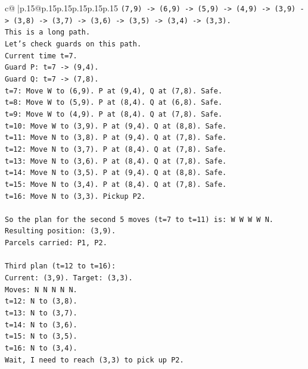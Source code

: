 \documentclass{article}
\begin{document}
{\begin{supertabular}{c@{$\;$}|p{.15\linewidth}@{}p{.15\linewidth}p{.15\linewidth}p{.15\linewidth}p{.15\linewidth}p{.15\linewidth}}
{{{\texttt{(7,9) {-}> (6,9) {-}> (5,9) {-}> (4,9) {-}> (3,9) {-}> (3,8) {-}> (3,7) {-}> (3,6) {-}> (3,5) {-}> (3,4) {-}> (3,3).} \\
\texttt{This is a long path.} \\
\texttt{Let's check guards on this path.} \\
\texttt{Current time t=7.} \\
\texttt{Guard P: t=7 {-}> (9,4).} \\
\texttt{Guard Q: t=7 {-}> (7,8).} \\
\texttt{t=7: Move W to (6,9). P at (9,4), Q at (7,8). Safe.} \\
\texttt{t=8: Move W to (5,9). P at (8,4). Q at (6,8). Safe.} \\
\texttt{t=9: Move W to (4,9). P at (8,4). Q at (7,8). Safe.} \\
\texttt{t=10: Move W to (3,9). P at (9,4). Q at (8,8). Safe.} \\
\texttt{t=11: Move N to (3,8). P at (9,4). Q at (7,8). Safe.} \\
\texttt{t=12: Move N to (3,7). P at (8,4). Q at (7,8). Safe.} \\
\texttt{t=13: Move N to (3,6). P at (8,4). Q at (7,8). Safe.} \\
\texttt{t=14: Move N to (3,5). P at (9,4). Q at (8,8). Safe.} \\
\texttt{t=15: Move N to (3,4). P at (8,4). Q at (7,8). Safe.} \\
\texttt{t=16: Move N to (3,3). Pickup P2.} \\
\\ 
\texttt{So the plan for the second 5 moves (t=7 to t=11) is: W W W W N.} \\
\texttt{Resulting position: (3,9).} \\
\texttt{Parcels carried: P1, P2.} \\
\\ 
\texttt{Third plan (t=12 to t=16):} \\
\texttt{Current: (3,9). Target: (3,3).} \\
\texttt{Moves: N N N N N.} \\
\texttt{t=12: N to (3,8).} \\
\texttt{t=13: N to (3,7).} \\
\texttt{t=14: N to (3,6).} \\
\texttt{t=15: N to (3,5).} \\
\texttt{t=16: N to (3,4).} \\
\texttt{Wait, I need to reach (3,3) to pick up P2.} \\
}}}
\end{supertabular}}
\end{document}
